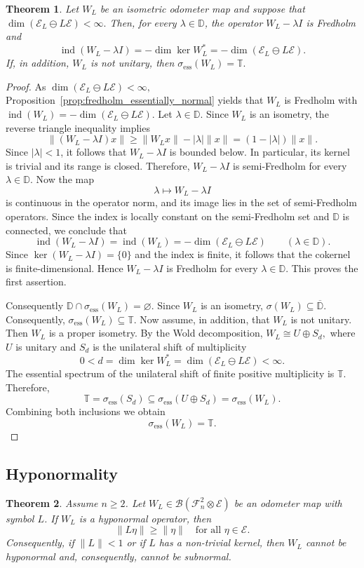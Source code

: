 \documentclass[12pt]{amsart}
\newtheorem{theorem}{Theorem}[section]
\theoremstyle{definition}
\theoremstyle{remark}
\def \D{\mathbb{D}}
\def \T{\mathbb{T}}
\newcommand{\clb}{\mathcal{B}}
\newcommand{\cle}{\mathcal{E}}
\newcommand{\clf}{\mathcal{F}}
\newcommand{\ind}{\operatorname{ind}}
\numberwithin{equation}{section}
\begin{document}
\begin{theorem}\label{thm:coburn_odometer}
Let \(W_L\) be an isometric odometer map and suppose that $\dim(\cle_L\ominus L\cle)<\infty.$
Then, for every \(\lambda\in\D\), the operator \(W_L-\lambda I\) is Fredholm and
\[
\ind(W_L-\lambda I)
=
-\dim\ker W_L^*
=
-\dim(\cle_L\ominus L\cle).
\]
If, in addition, \(W_L\) is not unitary, then $\sigma_{\mathrm{ess}}(W_L)=\T.$
\end{theorem}
\begin{proof}
As $\dim(\cle_L\ominus L\cle)<\infty,$ 
Proposition~\ref{prop:fredholm_essentially_normal} yields that $W_L$ is Fredholm with $\ind(W_L)
=
-\dim(\cle_L\ominus L\cle).$
Let $\lambda \in \D$. Since $W_L$ is an isometry, the reverse triangle inequality implies
\[
\|(W_L-\lambda I)x\|
\ge
\|W_Lx\|-|\lambda|\|x\|
=
(1-|\lambda|)\|x\|.
\]
Since $|\lambda|<1$, it follows that $W_L-\lambda I$ is bounded below. In particular, its kernel is trivial and its range is closed. Therefore, $W_L-\lambda I$ is semi-Fredholm for every $\lambda \in \D$. Now the map
\[
\lambda\mapsto W_L-\lambda I
\]
is continuous in the operator norm, and its image lies in the set of semi-Fredholm operators. Since the index is locally constant on the semi-Fredholm set and $\D$ is connected, we conclude that
\[
\ind(W_L-\lambda I)=\ind(W_L)=
-\dim(\cle_L\ominus L\cle)
\qquad (\lambda\in\D).
\]
Since $\ker(W_L-\lambda I)=\{0\}$ and the index is finite, it follows that the cokernel is finite-dimensional. Hence $W_L-\lambda I$ is Fredholm for every $\lambda\in\D$.  This proves the first assertion.

Consequently $\D\cap\sigma_{\mathrm{ess}}(W_L)=\varnothing.$
Since $W_L$ is an isometry, $\sigma(W_L)\subseteq \overline{\D}.$
Consequently, $\sigma_{\mathrm{ess}}(W_L)\subseteq \T.$
Now assume, in addition, that \(W_L\) is not unitary. Then \(W_L\) is a proper
isometry. By the Wold decomposition, $W_L \cong U\oplus S_d,$
where \(U\) is unitary and \(S_d\) is the unilateral shift of multiplicity
\[
0<d=\dim\ker W_L^*
=
\dim(\cle_L\ominus L\cle)<\infty.
\]
The essential spectrum of the unilateral shift of finite positive multiplicity
is \(\T\). Therefore,
\[
\T
=
\sigma_{\mathrm{ess}}(S_d)
\subseteq
\sigma_{\mathrm{ess}}(U\oplus S_d)
=
\sigma_{\mathrm{ess}}(W_L).
\]
Combining both inclusions
we obtain
\[
\sigma_{\mathrm{ess}}(W_L)=\T.
\]
\end{proof}



\subsection{Hyponormality} \label{sec:hyponormal}
\begin{theorem}\label{thm:hyponormality_bound}
Assume $n \ge 2$. Let $W_L \in \clb(\clf_n^2 \otimes \cle)$ be an odometer map with symbol $L$. If $W_L$ is a hyponormal operator, then 
\[
\|L\eta\| \ge \|\eta\| \quad \text{for all } \eta \in \cle.
\]
Consequently, if \(\|L\|<1\) or if \(L\) has a non-trivial kernel, then
\(W_L\) cannot be hyponormal and, consequently, cannot be subnormal.
\end{theorem}
\end{document}
